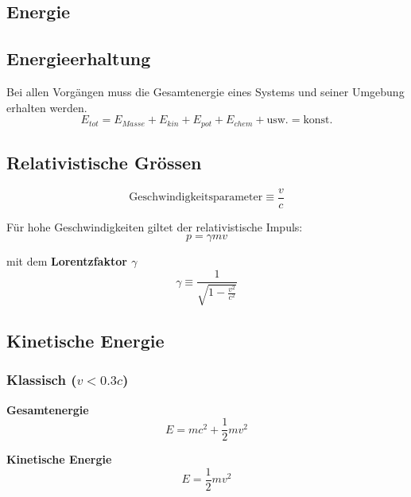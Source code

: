 \documentclass[7pt]{article}
\begin{document}
\begin{multicols*}{3}

\section{Energie}

\subsection{Energieerhaltung}

Bei allen Vorg{\"a}ngen muss die Gesamtenergie eines Systems und seiner Umgebung erhalten werden.
\begin{equation*}
	E_{tot} = E_{Masse} + E_{kin} + E_{pot} + E_{chem} + \text{usw.} = \text{konst.}
\end{equation*}

\subsection{Relativistische Gr{\"o}ssen}

\begin{equation*}
	\text{Geschwindigkeitsparameter} \equiv \frac{v}{c}
\end{equation*}

F{\"u}r hohe Geschwindigkeiten giltet der relativistische Impuls:
\begin{equation*}
	p = \gamma mv
\end{equation*}

mit dem \textbf{Lorentzfaktor $\gamma$}
\begin{equation*}
	\gamma \equiv \frac{1}{\sqrt{1-\frac{v^2}{c^2}}}
\end{equation*}

\subsection{Kinetische Energie}

\subsubsection{Klassisch ($v < 0.3c$)}

\textbf{Gesamtenergie}
\begin{equation*}
	E = mc^2 + \frac{1}{2}mv^2
\end{equation*}

\textbf{Kinetische Energie}
\begin{equation*}
	E = \frac{1}{2}mv^2
\end{equation*}


\end{multicols*}
\end{document}
